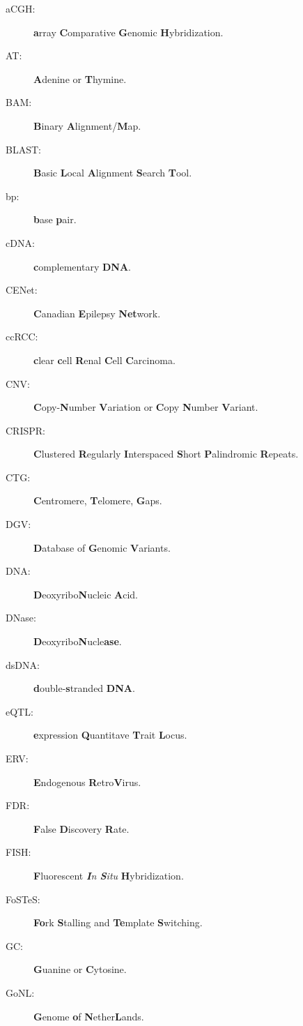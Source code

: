 \begin{description}
\item[aCGH:] {\bf a}rray {\bf C}omparative {\bf G}enomic {\bf H}ybridization.
\item[AT:] {\bf A}denine or {\bf T}hymine.
\item[BAM:] \textbf{B}inary {\bf A}lignment/\textbf{M}ap.
\item[BLAST:] \textbf{B}asic \textbf{L}ocal \textbf{A}lignment \textbf{S}earch \textbf{T}ool.
\item[bp:] {\bf b}ase {\bf p}air.
\item[cDNA:] \textbf{c}omplementary \textbf{DNA}.
\item[CENet:] {\bf C}anadian {\bf E}pilepsy {\bf Net}work.
\item[ccRCC:] {\bf c}lear {\bf c}ell {\bf R}enal {\bf C}ell {\bf C}arcinoma.
\item[CNV:] {\bf C}opy-{\bf N}umber {\bf V}ariation or {\bf C}opy {\bf N}umber {\bf V}ariant.
\item[CRISPR:] \textbf{C}lustered \textbf{R}egularly \textbf{I}nterspaced \textbf{S}hort \textbf{P}alindromic \textbf{R}epeats.
\item[CTG:] {\bf C}entromere, {\bf T}elomere, {\bf G}aps.
\item[DGV:] {\bf D}atabase of {\bf G}enomic {\bf V}ariants.
\item[DNA:] \textbf{D}eoxyribo\textbf{N}ucleic \textbf{A}cid.
\item[DNase:] \textbf{D}eoxyribo\textbf{N}ucle\textbf{ase}.
\item[dsDNA:] \textbf{d}ouble-\textbf{s}tranded \textbf{DNA}.
\item[eQTL:] {\bf e}xpression {\bf Q}uantitave {\bf T}rait {\bf L}ocus.
\item[ERV:] \textbf{E}ndogenous \textbf{R}etro\textbf{V}irus.
\item[FDR:] {\bf F}alse {\bf D}iscovery {\bf R}ate.
\item[FISH:] {\bf F}luorescent {\it {\bf I}n {\bf S}itu} {\bf H}ybridization. 
\item[FoSTeS:] {\bf Fo}rk {\bf S}talling and {\bf Te}mplate {\bf S}witching.
\item[GC:] {\bf G}uanine or {\bf C}ytosine.
\item[GoNL:] {\bf G}enome {\bf o}f {\bf N}ether{\bf L}ands.%

\end{description}
